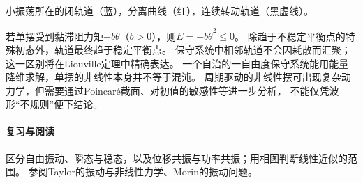 \begin{center}

小振荡所在的闭轨道（蓝），分离曲线（红），连续转动轨道（黑虚线）。
\end{center}

若单摆受到黏滞阻力矩$-b\dot\theta$（$b > 0$），则$\dot E = -b\dot\theta^2 \leq 0$。
除趋于不稳定平衡点的特殊初态外，轨道最终趋于稳定平衡点。
保守系统中相邻轨道不会因耗散而汇聚；这一区别将在Liouville定理中精确表达。
一个自治的一自由度保守系统能用能量降维求解，单摆的非线性本身并不等于混沌。
周期驱动的非线性摆可出现复杂动力学，但需要通过Poincaré截面、对初值的敏感性等进一步分析，
不能仅凭波形“不规则”便下结论。

\paragraph{复习与阅读}
区分自由振动、瞬态与稳态，以及位移共振与功率共振；用相图判断线性近似的范围。
参阅Taylor的振动与非线性力学、Morin的振动问题。

